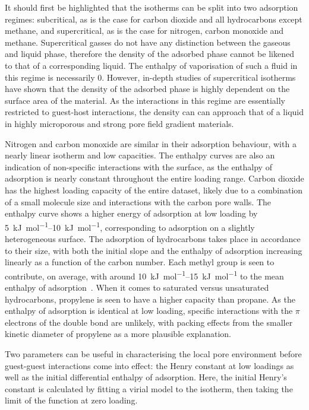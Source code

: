 It should first be highlighted that the isotherms can be split into 
two adsorption regimes: subcritical, as is the case for carbon
dioxide and all hydrocarbons except methane, and supercritical,
as is the case for nitrogen, carbon monoxide and methane.
Supercritical gasses do not have any distinction between the 
gaseous and liquid phase, therefore the density of the adsorbed phase
cannot be likened to that of a corresponding liquid. The enthalpy
of vaporisation of such a fluid in this regime is necessarily 0.
However, in-depth studies of supercritical 
isotherms~\cite{doAdsorptionSupercriticalFluids2003} have shown that
the density of the adsorbed phase is highly dependent on the surface 
area of the material. As the interactions in this regime are essentially
restricted to guest-host interactions, the density can can approach that
of a liquid in highly microporous and strong pore field gradient materials.

Nitrogen and carbon monoxide are similar in their adsorption behaviour,
with a nearly linear isotherm and low capacities.
The enthalpy curves are also an indication of non-specific 
interactions with the surface, as the enthalpy of adsorption
is nearly constant throughout the entire loading range.
Carbon dioxide has the highest loading capacity of the entire dataset, likely
due to a combination of a small molecule size and interactions with 
the carbon pore walls. The enthalpy curve shows a higher energy of 
adsorption at low loading by \SIrange{5}{10}{\kilo\joule\per\mole}, 
corresponding to adsorption on a slightly heterogeneous surface.
The adsorption of hydrocarbons takes place in accordance to their size, with
both the initial slope and the enthalpy of adsorption increasing linearly
as a function of the carbon number. Each methyl group is seen 
to contribute, on average, with around \SIrange{10}{15}{\kilo\joule\per\mole}
to the mean enthalpy of adsorption~\cite{denayerChromatographicStudyAdsorption1998}.
When it comes to saturated versus unsaturated hydrocarbons, propylene is 
seen to have a higher capacity than propane. As the enthalpy of 
adsorption is identical at low loading, specific interactions with the 
\(\pi\) electrons of the double bond are unlikely, with packing effects 
from the smaller kinetic diameter of propylene as a more plausible
explanation.

Two parameters can be useful in characterising the local pore environment
before guest-guest interactions come into effect: the Henry constant at
low loadings as well as the initial differential enthalpy of adsorption. 
Here, the initial Henry's constant is calculated by fitting a virial model 
to the isotherm, then taking the limit of the function at zero loading. 


